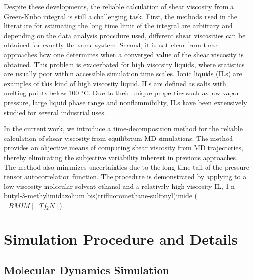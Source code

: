 \documentclass[12pt]{article}
\begin{document}
Despite these developments, the reliable calculation of shear viscosity from a Green-Kubo integral is still a challenging task. First, the methods used in the literature for estimating the long time limit of the integral are arbitrary and depending on the data analysis procedure used, different shear viscosities can be obtained for exactly the same system. Second, it is not clear from these approaches how one determines when a converged value of the shear viscosity is obtained. This problem is exacerbated for high viscosity liquids, where statistics are usually poor within accessible simulation time scales. Ionic liquids (ILs) are examples of this kind of high viscosity liquid. ILs are defined as salts with melting points below 100 $^\circ$C.
Due to their unique properties such as low vapor pressure, large liquid phase range and nonflammibility,
ILs have been extensively studied for several industrial uses. 
\cite{Maginn.JPCL.1.3494.2010,  %
Atilhan.IECR.52.16774.2013,     %
Blahusiak.JCT.72.54.2014,       %
Dutt.JPCB.118.13244.2014,       %
Garrett.JPC.Lett.5.1541.2014}   %


In the current work, we introduce a time-decomposition method for the reliable calculation of shear viscosity 
from equilibrium MD simulations. The method provides an objective means of computing shear viscosity from MD trajectories, thereby eliminating the subjective variability inherent in previous approaches. The method also minimizes uncertainties due to the long time tail of the pressure tensor autocorrelation function.
The procedure is demonstrated by applying to a low viscosity molecular solvent ethanol and a relatively high viscosity IL, 
1-n-butyl-3-methylimidazolium bis(trifluoromethane-sulfonyl)imide ($[BMIM][Tf_2N]$).

\section{Simulation Procedure and Details}

\subsection{Molecular Dynamics Simulation}
\end{document}
